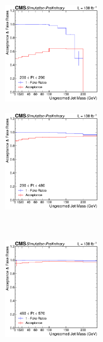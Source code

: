     \begin{figure}[htp!]
	\centering
	\begin{subfigure}
		\centering
		\includegraphics[width=0.45\textwidth]{figures/multijet/dijet/fakerates_ungroomed_0.pdf}
              \end{subfigure}%
                \begin{subfigure}
		\centering
		\includegraphics[width=0.45\textwidth]{figures/multijet/dijet/fakerates_ungroomed_1.pdf}
              \end{subfigure}\\
              \begin{subfigure}
		\centering
		\includegraphics[width=0.45\textwidth]{figures/multijet/dijet/fakerates_ungroomed_2.pdf}

\end{subfigure}
\end{figure}
